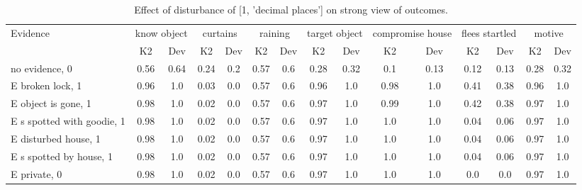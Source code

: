 \begin{table}\begin{tabular}{l|cc|cc|cc|cc|cc|cc|cc}\toprule\multirow{2}{*}{Evidence} & \multicolumn{2}{c}{know object}& \multicolumn{2}{c}{curtains}& \multicolumn{2}{c}{raining}& \multicolumn{2}{c}{target object}& \multicolumn{2}{c}{compromise house}& \multicolumn{2}{c}{flees startled}& \multicolumn{2}{c}{motive}\\& {K2} & {Dev}& {K2} & {Dev}& {K2} & {Dev}& {K2} & {Dev}& {K2} & {Dev}& {K2} & {Dev}& {K2} & {Dev}\\\midrule
no evidence, 0 & \cellcolor{Bittersweet}0.56&\cellcolor{Bittersweet}0.64&0.24&0.2&0.57&0.6&0.28&0.32&0.1&0.13&0.12&0.13&0.28&0.32\\E broken lock, 1 & 0.96&1.0&0.03&0.0&0.57&0.6&0.96&1.0&0.98&1.0&0.41&0.38&0.96&1.0\\E object is gone, 1 & 0.98&1.0&0.02&0.0&0.57&0.6&0.97&1.0&0.99&1.0&0.42&0.38&0.97&1.0\\E s spotted with goodie, 1 & 0.98&1.0&0.02&0.0&0.57&0.6&0.97&1.0&1.0&1.0&0.04&0.06&0.97&1.0\\E disturbed house, 1 & 0.98&1.0&0.02&0.0&0.57&0.6&0.97&1.0&1.0&1.0&0.04&0.06&0.97&1.0\\E s spotted by house, 1 & 0.98&1.0&0.02&0.0&0.57&0.6&0.97&1.0&1.0&1.0&0.04&0.06&0.97&1.0\\E private, 0 & 0.98&1.0&0.02&0.0&0.57&0.6&0.97&1.0&1.0&1.0&0.0&0.0&0.97&1.0\\\bottomrule\end{tabular}\caption{Effect of disturbance of [1, 'decimal places'] on strong view of outcomes.}\end{table}